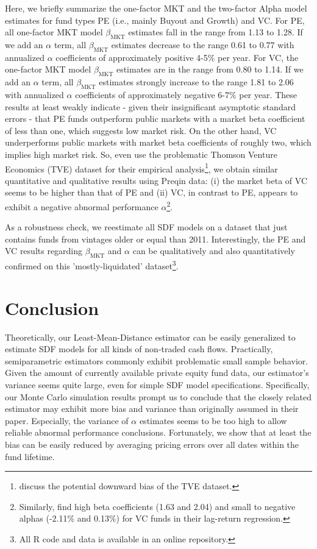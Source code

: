 \documentclass[12pt]{article}
\begin{document}
Here, we briefly summarize the one-factor MKT and the two-factor Alpha model estimates for fund types PE (i.e., mainly Buyout and Growth) and VC.
For PE, all one-factor MKT model $\beta_{\mathrm{MKT}}$ estimates fall in the range from 1.13 to 1.28. 
If we add an $\alpha$ term, all $\beta_{\mathrm{MKT}}$ estimates decrease to the range 0.61 to 0.77 with annualized $\alpha$ coefficients of approximately positive 4-5\% per year.
For VC, the one-factor MKT model $\beta_{\mathrm{MKT}}$ estimates are in the range from 0.80 to 1.14.
If we add an $\alpha$ term, all $\beta_{\mathrm{MKT}}$ estimates strongly increase to the range 1.81 to 2.06 with annualized $\alpha$ coefficients of approximately negative 6-7\% per year.
These results at least weakly indicate - given their insignificant asymptotic standard errors - that PE funds outperform public markets with a market beta coefficient of less than one, which suggests low market risk.
On the other hand, VC underperforms public markets with market beta coefficients of roughly two, which implies high market risk.
So, even \cite{DLP12} use the problematic Thomson Venture Economics (TVE) dataset for their empirical analysis\footnote{\cite{HJK14} discuss the potential downward bias of the TVE dataset.}, we obtain similar quantitative and qualitative results using Preqin data: (i) the market beta of VC seems to be higher than that of PE and (ii) VC, in contrast to PE, appears to exhibit a negative abnormal performance $\alpha$\footnote{Similarly, \cite[exhibit 4.6]{MY10} find high beta coefficients (1.63 and 2.04) and small to negative alphas (-2.11\% and 0.13\%) for VC funds in their lag-return regression.}.

As a robustness check, we reestimate all SDF models on a dataset that just contains funds from vintages older or equal than 2011.
Interestingly, the PE and VC results regarding $\beta_{\mathrm{MKT}}$ and $\alpha$ can be qualitatively and also quantitatively confirmed on this 'mostly-liquidated' dataset\footnote{All R code and data is available in an online repository. %
}.




\section{Conclusion}
\label{sec:conclusion}

Theoretically, our Least-Mean-Distance estimator can be easily generalized to estimate SDF models for all kinds of non-traded cash flows.
Practically, semiparametric estimators commonly exhibit problematic small sample behavior.
Given the amount of currently available private equity fund data, our estimator's variance seems quite large, even for simple SDF model specifications.
Specifically, our Monte Carlo simulation results prompt us to conclude that the closely related \cite{DLP12} estimator may exhibit more bias and variance than originally assumed in their paper.
Especially, the variance of $\alpha$ estimates seems to be too high to allow reliable abnormal performance conclusions.
Fortunately, we show that at least the bias can be easily reduced by averaging pricing errors over all dates within the fund lifetime.
\end{document}
